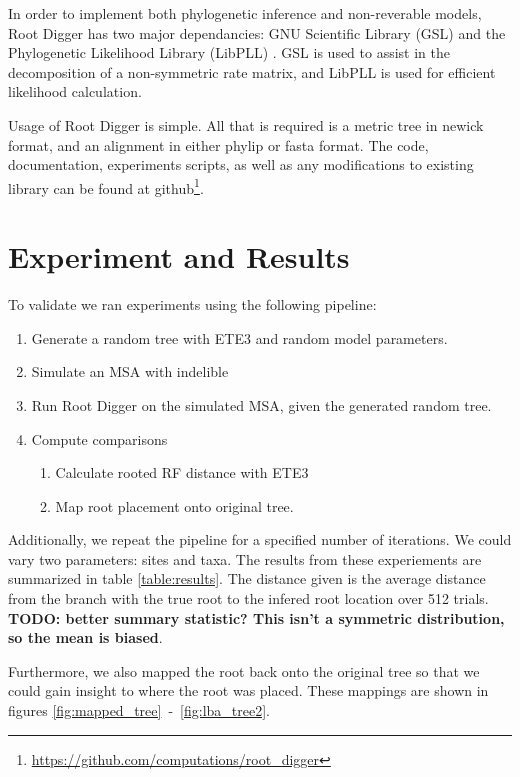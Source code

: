 \documentclass{article}
\begin{document}
In order to implement both phylogenetic inference and non-reverable models, Root
Digger has two major dependancies: GNU Scientific Library (GSL)
\cite{gough_gnu_2009} and the Phylogenetic Likelihood Library (LibPLL)
\cite{flouri_phylogenetic_2015}. GSL is used to assist in the decomposition of
a non-symmetric rate matrix, and LibPLL is used for efficient likelihood
calculation.

Usage of Root Digger is simple. All that is required is a metric tree in newick
format, and an alignment in either phylip or fasta format.  The code,
documentation, experiments scripts, as well as any modifications to existing
library can be found at
github\footnote{\url{https://github.com/computations/root_digger}}.

\section{Experiment and Results}

To validate we ran experiments using the following pipeline:

\begin{enumerate}
\item Generate a random tree with ETE3 \cite{huerta-cepas_ete_2016} and random
  model parameters.
\item Simulate an MSA with indelible \cite{fletcher_indelible:_2009}
\item Run Root Digger on the simulated MSA, given the generated random tree.
\item Compute comparisons
\begin{enumerate}
  \item Calculate rooted RF distance with ETE3 \cite{robinson_comparison_1981}
  \item Map root placement onto original tree.
\end{enumerate}
\end{enumerate}

Additionally, we repeat the pipeline for a specified number of iterations. We
could vary two parameters: sites and taxa. The results from these experiements
are summarized in table \ref{table:results}. The distance given is the average
distance from the branch with the true root to the infered root location over
512 trials. {\bf TODO: better summary statistic? This isn't a symmetric
distribution, so the mean is biased}.

Furthermore, we also mapped the root back onto the original tree so that we
could gain insight to where the root was placed. These mappings are shown in
figures \ref{fig:mapped_tree}~-~\ref{fig:lba_tree2}.
\end{document}
